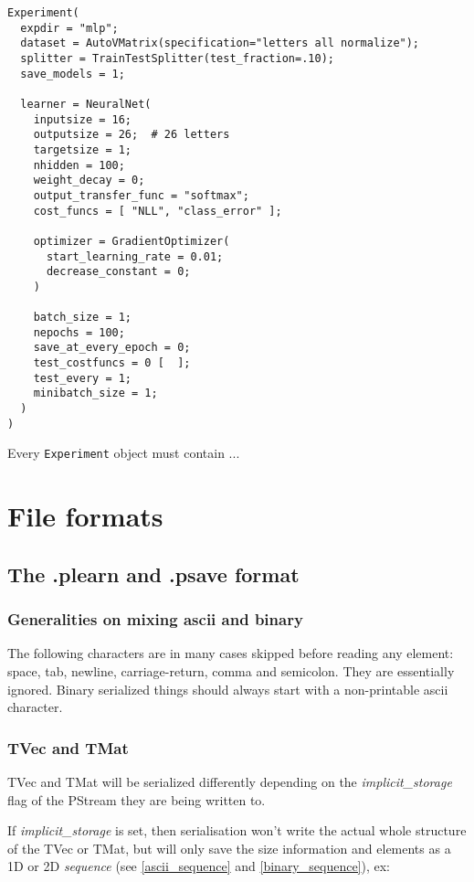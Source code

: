 \documentclass[11pt]{book}
\begin{document}
\begin{verbatim}
Experiment(
  expdir = "mlp";
  dataset = AutoVMatrix(specification="letters all normalize");
  splitter = TrainTestSplitter(test_fraction=.10);
  save_models = 1;

  learner = NeuralNet(
    inputsize = 16;
    outputsize = 26;  # 26 letters
    targetsize = 1;
    nhidden = 100;
    weight_decay = 0;
    output_transfer_func = "softmax";
    cost_funcs = [ "NLL", "class_error" ];

    optimizer = GradientOptimizer(
      start_learning_rate = 0.01;
      decrease_constant = 0;
    )

    batch_size = 1;
    nepochs = 100;
    save_at_every_epoch = 0;
    test_costfuncs = 0 [  ];
    test_every = 1;
    minibatch_size = 1;
  )
)
\end{verbatim}

Every \verb!Experiment! object must contain ...

\chapter{File formats}

\section{The .plearn and .psave format}

\subsection{Generalities on mixing ascii and binary}

The following characters are in many cases skipped before reading any
element: space, tab, newline, carriage-return, comma and semicolon. They
are essentially ignored. Binary serialized things should always start with
a non-printable ascii character.

\subsection{TVec and TMat}

TVec and TMat will be serialized differently depending on the {\em
implicit\_storage} flag of the PStream they are being written to.

If {\em implicit\_storage} is set, then serialisation won't write the actual
whole structure of the TVec or TMat, but will only save the size information
and elements as a 1D or 2D {\em sequence} (see \ref{ascii_sequence} and
\ref{binary_sequence}), ex:
\end{document}

